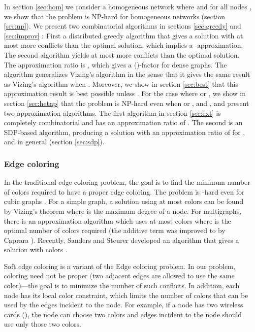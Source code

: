 \documentclass[titlepage, 11pt]{article}
\newcommand{\B}{\vspace*{-\smallskipamount}}
\begin{document}
In section \ref{sec:hom} we consider a homogeneous network where 
and  for all nodes ,  we show 
that the problem is NP-hard for homogeneous networks (section \ref{sec:np}).
We present two combinatorial algorithms in sections \ref{sec:greedy} and \ref{sec:improv} :
First a distributed greedy algorithm that
gives a solution with at most  more conflicts than the optimal solution,
which implies a -approximation. 
The second algorithm  yields at most  more conflicts than the optimal solution. 
The approximation ratio is , which gives a ()-factor for dense graphs. 
The algorithm generalizes Vizing's algorithm in the sense that it gives the same result as Vizing's algorithm when . Moreover, we show in section \ref{sec:best} that this approximation result is best possible unless .
\B
For the case where  or ,
we show in section \ref{sec:hetnp} that the problem is NP-hard even when  or , and , and present two approximation algorithms.
The first algorithm in section \ref{sec:ext} is completely combinatorial and has an approximation ratio of . The second is an SDP-based algorithm, producing a solution with an approximation ratio of  for , and  in general (section \ref{sec:sdp}).

\subsubsection{Edge coloring}
In the traditional edge coloring problem,
the goal is to find the minimum number 
of colors required to have a proper edge coloring.
The problem is -hard even for cubic graphs \cite{Holyer}.
For a simple graph, a solution using at most  colors
can be found by Vizing's theorem \cite{V64} where
 is the maximum degree of a node.
For multigraphs, there is an approximation algorithm
which uses at most  colors where  is the optimal number of colors 
required \cite{multigraph} (the additive term was improved to  by Caprara
 \cite{caprara98improving}). 
Recently, Sanders and Steurer developed an algorithm that
gives a solution with  colors \cite{sanders05}.


{\sc Soft edge coloring} is a variant of the {\sc Edge coloring} problem.
In our problem, coloring need not be proper (two adjacent edges
are allowed to use the same color)---the goal is to minimize the
number of such conflicts. In addition, each node has its local color constraint, which limits the
number of colors that can be used by the edges incident to the node.
For example, if a node has two wireless cards (), 
the node can choose two colors 
and edges incident to the node should use only those two colors.
\end{document}
